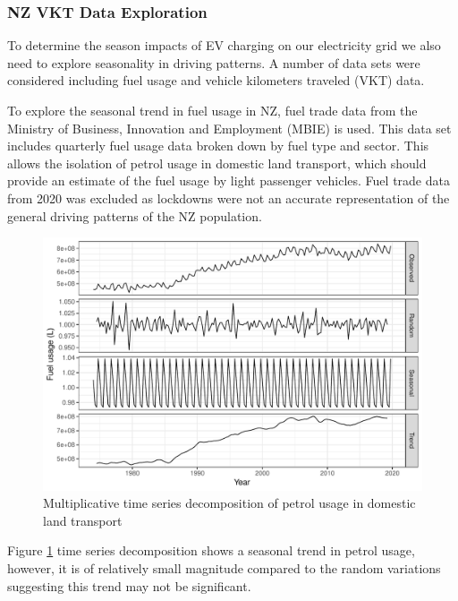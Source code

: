 \documentclass[
]{article}
\begin{document}
\hypertarget{nz-vkt-data-exploration}{%
\subsubsection{NZ VKT Data Exploration}\label{nz-vkt-data-exploration}}

To determine the season impacts of EV charging on our electricity grid
we also need to explore seasonality in driving patterns. A number of
data sets were considered including fuel usage and vehicle kilometers
traveled (VKT) data.

To explore the seasonal trend in fuel usage in NZ, fuel trade data
\cite{fuel_trade} from the Ministry of Business, Innovation and
Employment (MBIE) is used. This data set includes quarterly fuel usage
data broken down by fuel type and sector. This allows the isolation of
petrol usage in domestic land transport, which should provide an
estimate of the fuel usage by light passenger vehicles. Fuel trade data
from 2020 was excluded as lockdowns were not an accurate representation
of the general driving patterns of the NZ population.

\begin{figure}
\centering
\includegraphics{final_report_files/figure-latex/petrol_ts-1.pdf}
\caption{Multiplicative time series decomposition of petrol usage in
domestic land transport\label{fig:petrol_ts}}
\end{figure}

Figure \ref{fig:petrol_ts} time series decomposition shows a seasonal
trend in petrol usage, however, it is of relatively small magnitude
compared to the random variations suggesting this trend may not be
significant.
\end{document}

